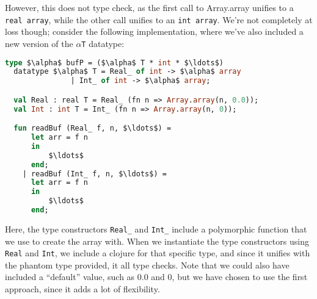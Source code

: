 However, this does not type check, as the first call to Array.array
unifies to a \texttt{real array}, while the other call unifies to an
\texttt{int array}. We're not completely at loss though; consider the
following implementation, where we've also included a new version of
the \texttt{$\alpha$T} datatype:

\begin{lstlisting}[language=ML, caption=readBuf implementation using
    clojures,mathescape]
  type $\alpha$ bufP = ($\alpha$ T * int * $\ldots$)
  datatype $\alpha$ T = Real_ of int -> $\alpha$ array
               | Int_ of int -> $\alpha$ array;

  val Real : real T = Real_ (fn n => Array.array(n, 0.0));
  val Int : int T = Int_ (fn n => Array.array(n, 0));

  fun readBuf (Real_ f, n, $\ldots$) =
      let arr = f n
      in
          $\ldots$
      end;
    | readBuf (Int_ f, n, $\ldots$) =
      let arr = f n
      in
          $\ldots$
      end;
\end{lstlisting}

Here, the type constructors \texttt{Real\_} and \texttt{Int\_} include a
polymorphic function that we use to create the array with. When we
instantiate the type constructors using \texttt{Real} and
\texttt{Int}, we include a clojure for that specific type, and since
it unifies with the phantom type provided, it all type checks. Note
that we could also have included a ``default'' value, such as $0.0$
and $0$, but we have chosen to use the first approach, since it adds a
lot of flexibility.
